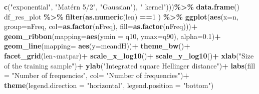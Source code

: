 \documentclass[
]{article}
\newenvironment{Shaded}{\begin{snugshade}}{\end{snugshade}}
\newcommand{\AttributeTok}[1]{\textcolor[rgb]{0.13,0.29,0.53}{#1}}
\newcommand{\DecValTok}[1]{\textcolor[rgb]{0.00,0.00,0.81}{#1}}
\newcommand{\FloatTok}[1]{\textcolor[rgb]{0.00,0.00,0.81}{#1}}
\newcommand{\FunctionTok}[1]{\textcolor[rgb]{0.13,0.29,0.53}{\textbf{#1}}}
\newcommand{\NormalTok}[1]{#1}
\newcommand{\SpecialCharTok}[1]{\textcolor[rgb]{0.81,0.36,0.00}{\textbf{#1}}}
\newcommand{\StringTok}[1]{\textcolor[rgb]{0.31,0.60,0.02}{#1}}
\begin{document}
\begin{Shaded}
\begin{Highlighting}[]
                                              \FunctionTok{c}\NormalTok{(}\StringTok{"exponential"}\NormalTok{,}
                                                \StringTok{"Matérn 5/2"}\NormalTok{,}
                                                \StringTok{"Gaussian"}\NormalTok{),}
                                              \StringTok{" kernel"}\NormalTok{)))}\SpecialCharTok{\%\textgreater{}\%}
  \FunctionTok{data.frame}\NormalTok{()}
\NormalTok{df\_res\_plot }\SpecialCharTok{\%\textgreater{}\%}
  \FunctionTok{filter}\NormalTok{(}\FunctionTok{as.numeric}\NormalTok{(len) }\SpecialCharTok{==}\DecValTok{1}\NormalTok{ ) }\SpecialCharTok{\%\textgreater{}\%}
  \FunctionTok{ggplot}\NormalTok{(}\FunctionTok{aes}\NormalTok{(}\AttributeTok{x=}\NormalTok{n, }\AttributeTok{group=}\NormalTok{nFreq, }
             \AttributeTok{col=}\FunctionTok{as.factor}\NormalTok{(nFreq), }\AttributeTok{fill=}\FunctionTok{as.factor}\NormalTok{(nFreq)))}\SpecialCharTok{+}
  \FunctionTok{geom\_ribbon}\NormalTok{(}\AttributeTok{mapping=}\FunctionTok{aes}\NormalTok{(}\AttributeTok{ymin =}\NormalTok{ q10, }\AttributeTok{ymax=}\NormalTok{q90), }\AttributeTok{alpha=}\FloatTok{0.1}\NormalTok{)}\SpecialCharTok{+}
  \FunctionTok{geom\_line}\NormalTok{(}\AttributeTok{mapping=} \FunctionTok{aes}\NormalTok{(}\AttributeTok{y=}\NormalTok{meandH))}\SpecialCharTok{+}
  \FunctionTok{theme\_bw}\NormalTok{()}\SpecialCharTok{+}
  \FunctionTok{facet\_grid}\NormalTok{(len}\SpecialCharTok{\textasciitilde{}}\NormalTok{matpar)}\SpecialCharTok{+}
  \FunctionTok{scale\_x\_log10}\NormalTok{()}\SpecialCharTok{+}
  \FunctionTok{scale\_y\_log10}\NormalTok{()}\SpecialCharTok{+}
  \FunctionTok{xlab}\NormalTok{(}\StringTok{"Size of the training sample"}\NormalTok{)}\SpecialCharTok{+}
  \FunctionTok{ylab}\NormalTok{(}\StringTok{"Integrated square Hellinger distance"}\NormalTok{)}\SpecialCharTok{+}
  \FunctionTok{labs}\NormalTok{(}\AttributeTok{fill =} \StringTok{"Number of frequencies"}\NormalTok{,}
       \AttributeTok{col=} \StringTok{"Number of frequencies"}\NormalTok{)}\SpecialCharTok{+}
  \FunctionTok{theme}\NormalTok{(}\AttributeTok{legend.direction =} \StringTok{"horizontal"}\NormalTok{, }\AttributeTok{legend.position =} \StringTok{"bottom"}\NormalTok{)}
\end{Highlighting}
\end{Shaded}
\end{document}
